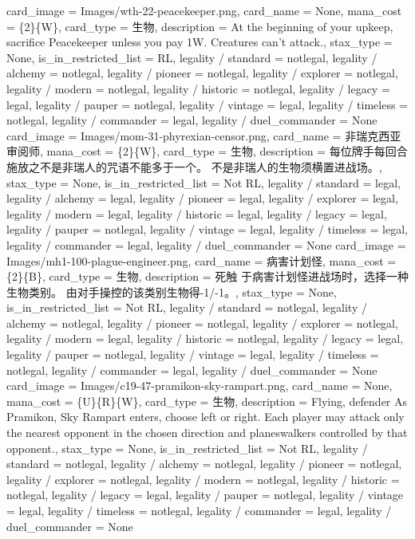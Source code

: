 \documentclass[lang = cn, color = black, 10pt]{AllThatStax}
\begin{document}
\card
{
	card_image = Images/wth-22-peacekeeper.png,
	card_name = None,
	mana_cost = \{2\}\{W\},
	card_type = 生物,
	description = At the beginning of your upkeep, sacrifice Peacekeeper unless you pay {1}{W}.
	Creatures can't attack.,
	stax_type = None,
	is_in_restricted_list = RL,
	legality / standard = notlegal,
	legality / alchemy = notlegal,
	legality / pioneer = notlegal,
	legality / explorer = notlegal,
	legality / modern = notlegal,
	legality / historic = notlegal,
	legality / legacy = legal,
	legality / pauper = notlegal,
	legality / vintage = legal,
	legality / timeless = notlegal,
	legality / commander = legal,
	legality / duel_commander = None
}
\card
{
	card_image = Images/mom-31-phyrexian-censor.png,
	card_name = 非瑞克西亚审阅师,
	mana_cost = \{2\}\{W\},
	card_type = 生物,
	description = 每位牌手每回合施放之不是非瑞人的咒语不能多于一个。
	不是非瑞人的生物须横置进战场。,
	stax_type = None,
	is_in_restricted_list = Not RL,
	legality / standard = legal,
	legality / alchemy = legal,
	legality / pioneer = legal,
	legality / explorer = legal,
	legality / modern = legal,
	legality / historic = legal,
	legality / legacy = legal,
	legality / pauper = notlegal,
	legality / vintage = legal,
	legality / timeless = legal,
	legality / commander = legal,
	legality / duel_commander = None
}
\card
{
	card_image = Images/mh1-100-plague-engineer.png,
	card_name = 病害计划怪,
	mana_cost = \{2\}\{B\},
	card_type = 生物,
	description = 死触
	于病害计划怪进战场时，选择一种生物类别。
	由对手操控的该类别生物得-1/-1。,
	stax_type = None,
	is_in_restricted_list = Not RL,
	legality / standard = notlegal,
	legality / alchemy = notlegal,
	legality / pioneer = notlegal,
	legality / explorer = notlegal,
	legality / modern = legal,
	legality / historic = notlegal,
	legality / legacy = legal,
	legality / pauper = notlegal,
	legality / vintage = legal,
	legality / timeless = notlegal,
	legality / commander = legal,
	legality / duel_commander = None
}
\card
{
	card_image = Images/c19-47-pramikon-sky-rampart.png,
	card_name = None,
	mana_cost = \{U\}\{R\}\{W\},
	card_type = 生物,
	description = Flying, defender
	As Pramikon, Sky Rampart enters, choose left or right.
	Each player may attack only the nearest opponent in the chosen direction and planeswalkers controlled by that opponent.,
	stax_type = None,
	is_in_restricted_list = Not RL,
	legality / standard = notlegal,
	legality / alchemy = notlegal,
	legality / pioneer = notlegal,
	legality / explorer = notlegal,
	legality / modern = notlegal,
	legality / historic = notlegal,
	legality / legacy = legal,
	legality / pauper = notlegal,
	legality / vintage = legal,
	legality / timeless = notlegal,
	legality / commander = legal,
	legality / duel_commander = None
}
\end{document}
